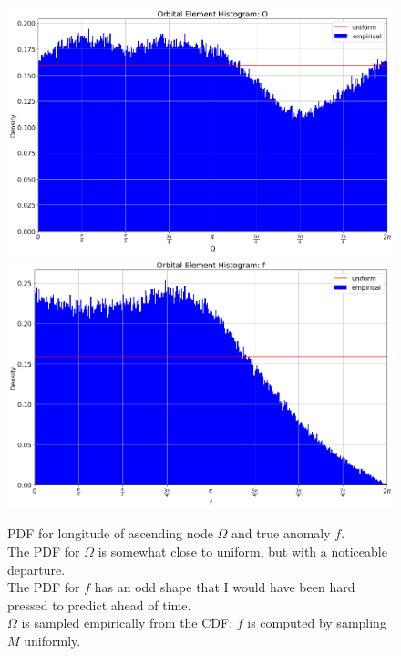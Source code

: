 \begin{figure}[hbt!]
\begin{center}
\includegraphics[width=1.0\textwidth]{../figs/elts/elt_hist_Omega_node.png}
\includegraphics[width=1.0\textwidth]{../figs/elts/elt_hist_f.png}
\caption{PDF for longitude of ascending node $\Omega$ and true anomaly $f$.\\ 
The PDF for $\Omega$ is somewhat close to uniform, but with a noticeable departure.\\
The PDF for $f$ has an odd shape that I would have been hard pressed to predict ahead of time.\\
$\Omega$ is sampled empirically from the CDF; $f$ is computed by sampling $M$ uniformly.}
\end{center}
\end{figure}
\clearpage

